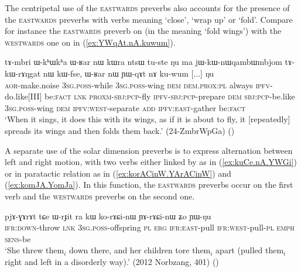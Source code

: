 The centripetal use of the \textsc{eastwards} preverbs also accounts for the presence of the \textsc{eastwards} preverbs with verbs meaning `close', `wrap up' or `fold'. Compare for instance the \textsc{eastwards} preverb on  (in the meaning `fold wings') with the \textsc{westwards} one on  in (\ref{ex:YWqAt.nA.kuwum}).

\begin{exe}
\ex \label{ex:YWqAt.nA.kuwum}
\gll  tɤ-mbri ɯ-kʰɯkʰa ɯ-ʁar nɯ kɯra ntsɯ tu-ste ŋu ma jɯ-kɯ-nɯqambɯmbjom tɤ-kɯ-rɤŋgat nɯ kɯ-fse, ɯ-ʁar nɯ ɲɯ-qɤt nɤ ku-wum [...] ŋu  \\
\textsc{aor}-make.noise \textsc{3sg}.\textsc{poss}-while \textsc{3sg}.\textsc{poss}-wing \textsc{dem} \textsc{dem}.\textsc{prox}:\textsc{pl} always \textsc{ipfv}-do.like[III] be:\textsc{fact} \textsc{lnk} \textsc{proxm}-\textsc{sbj}:\textsc{pcp}-fly \textsc{ipfv}-\textsc{sbj}:\textsc{pcp}-prepare \textsc{dem} \textsc{sbj}:\textsc{pcp}-be.like \textsc{3sg}.\textsc{poss}-wing \textsc{dem} \textsc{ipfv}:\textsc{west}-separate \textsc{add} \textsc{ipfv}:\textsc{east}-gather  {  } be:\textsc{fact} \\
\glt `When it sings, it does this with its wings, as if it is about to fly, it [repeatedly] spreads its wings and then folds them back.' (24-ZmbrWpGa)
()
\end{exe}

A separate use of the solar dimension preverbs is to express alternation between left and right motion, with two verbs either linked by  as in (\ref{ex:kuCe.nA.YWGi}) or in paratactic relation as in (\ref{ex:korACinW.YArACinW}) and (\ref{ex:komJA.YomJa}). In this function, the \textsc{eastwards} preverbs occur on the first verb and the \textsc{westwards} preverbs on the second one. 

\begin{exe}
\ex \label{ex:korACinW.YArACinW}
\gll pjɤ-ɣɤrɤt tɕe ɯ-rɟit ra kɯ ko-rɤɕi-nɯ ɲɤ-rɤɕi-nɯ ʑo ɲɯ-ŋu \\
\textsc{ifr}:\textsc{down}-throw \textsc{lnk} \textsc{3sg}.\textsc{poss}-offspring \textsc{pl} \textsc{erg} \textsc{ifr}:\textsc{east}-pull \textsc{ifr}:\textsc{west}-pull-\textsc{pl} \textsc{emph} \textsc{sens}-be \\
\glt `She threw them$_i$ down there, and her children tore them$_i$  apart (pulled them$_i$  right and left in a disorderly way).' (2012 Norbzang, 401) ()
\end{exe} 

